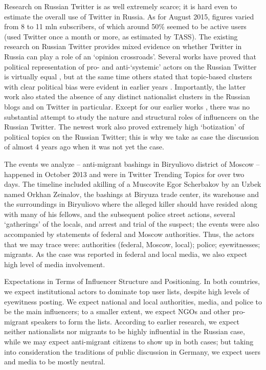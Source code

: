 Research on Russian Twitter is as well extremely scarce; it is hard even to estimate the overall use of Twitter in Russia. As for August 2015, figures varied from 8 to 11 mln subscribers, of which around 50\% seemed to be active users (used Twitter once a month or more, as estimated by TASS). The existing research on Russian Twitter provides mixed evidence on whether Twitter in Russia can play a role of an ‘opinion crossroads’. Several works have proved that political representation of pro- and anti-‘systemic’ actors on the Russian Twitter is virtually equal \cite{Greene,NikiporetsTakigawa}, but at the same time others stated that topic-based clusters with clear political bias were evident in earlier years \cite{BarashKelly}. Importantly, the latter work also stated the absence of any distinct nationalist clusters in the Russian blogs and on Twitter in particular. Except for our earlier works \cite{BodrunovaLitvinenkoBlekanov2016,BodrunovaBlekanovMaksimov}, there was no substantial attempt to study the nature and structural roles of influencers on the Russian Twitter. The newest work \cite{SanovichStukalPenfoldBrown} also proved extremely high ‘botization’ of political topics on the Russian Twitter; this is why we take as case the discussion of almost 4 years ago when it was not yet the case.

The events we analyze -- anti-migrant bashings in Biryuliovo district of Moscow -- happened in October 2013 and were in Twitter Trending Topics for over two days. The timeline included akilling of a Muscovite Egor Scherbakov by an Uzbek named Orkhan Zeinalov, the bashings at Biryuza trade center, its warehouse and the surroundings in Biryuliovo where the alleged killer should have resided along with many of his fellows, and the subsequent police street actions, several ‘gatherings’ of the locals, and arrest and trial of the suspect; the events were also accompanied by statements of federal and Moscow authorities. Thus, the actors that we may trace were: authorities (federal, Moscow, local); police; eyewitnesses; migrants. As the case was reported in federal and local media, we also expect high level of media involvement.

Expectations in Terms of Influencer Structure and Positioning. In both countries, we expect institutional actors to dominate top user lists, despite high levels of eyewitness posting. We expect national and local authorities, media, and police to be the main influencers; to a smaller extent, we expect NGOs and other pro-migrant speakers to form the lists. According to earlier research, we expect neither nationalists nor migrants to be highly influential in the Russian case, while we may expect anti-migrant citizens to show up in both cases; but taking into consideration the traditions of public discussion in Germany, we expect users and media to be mostly neutral.

